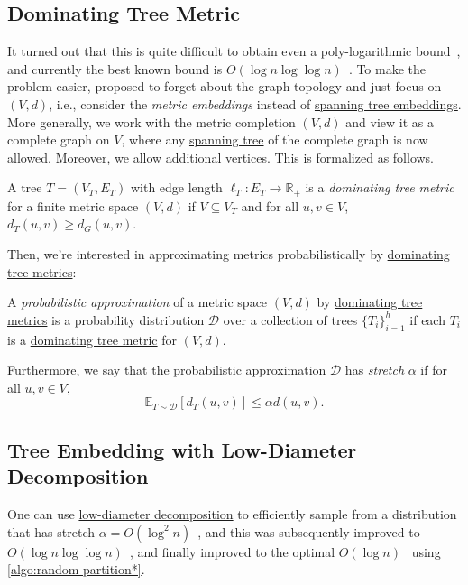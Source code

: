 \subsection{Dominating Tree Metric}
It turned out that this is quite difficult to obtain even a poly-logarithmic bound~\cite{elkin2005lower}, and currently the best known bound is \(O(\log n \log \log n)\)~\cite{abraham2008nearly}. To make the problem easier, \cite{bartal1996probabilistic} proposed to forget about the graph topology and just focus on \((V, d)\), i.e., consider the \emph{metric embeddings} instead of \hyperref[prb:tree-embedding]{spanning tree embeddings}. More generally, we work with the metric completion \((V, d)\) and view it as a complete graph on \(V\), where any \hyperref[def:spanning-tree]{spanning tree} of the complete graph is now allowed. Moreover, we allow additional vertices. This is formalized as follows.

\begin{definition}\label{def:dominating-tree-metric}
	A tree \(T = (V_T, E_T)\) with edge length \(\ell _T \colon E_T \to \mathbb{R} _+\) is a \emph{dominating tree metric} for a finite metric space \((V, d)\) if \(V \subseteq V_T\) and for all \(u, v \in V\), \(d_T(u, v) \geq d_G(u, v)\).
\end{definition}

Then, we're interested in approximating metrics probabilistically by \hyperref[def:dominating-tree-metric]{dominating tree metrics}:

\begin{definition}\label{def:probabilistic-approximation}
	A \emph{probabilistic approximation} of a metric space \((V, d)\) by \hyperref[def:dominating-tree-metric]{dominating tree metrics} is a probability distribution \(\mathcal{D} \) over a collection of trees \(\{ T_i \} _{i = 1}^{h}\) if each \(T_i\) is a \hyperref[def:dominating-tree-metric]{dominating tree metric} for \((V, d)\).
\end{definition}

Furthermore, we say that the \hyperref[def:probabilistic-approximation]{probabilistic approximation} \(\mathcal{D} \) has \emph{stretch} \(\alpha \) if for all \(u, v \in V\),
\[
	\mathbb{E}_{T \sim \mathcal{D} }[d_T(u, v)]
	\leq \alpha d(u, v).
\]

\subsection{Tree Embedding with Low-Diameter Decomposition}
One can use \hyperref[def:low-diameter-decomposition]{low-diameter decomposition} to efficiently sample from a distribution that has stretch \(\alpha = O(\log ^2 n)\)~\cite{bartal1996probabilistic}, and this was subsequently improved to \(O(\log n \log \log n)\)~\cite{bartal1998approximating}, and finally improved to the optimal \(O(\log n)\)~\cite{fakcharoenphol2003tight} using \autoref{algo:random-partition*}.

